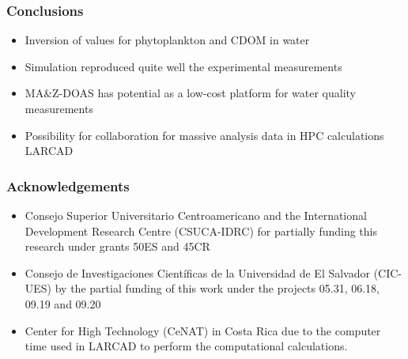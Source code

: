 \documentclass{beamer}
\begin{document}
\begin{frame}
\frametitle{Conclusions}
\begin{itemize}
\item Inversion of values for phytoplankton and CDOM in water
\item Simulation reproduced quite well the experimental measurements
\item MA\&Z-DOAS has potential as a low-cost platform for water quality measurements
\item Possibility for collaboration for massive analysis data in HPC calculations LARCAD
\end{itemize}
\end{frame}

\begin{frame}
\frametitle{Acknowledgements}
\begin{itemize}
\item Consejo Superior Universitario Centroamericano and the International Development Research Centre (CSUCA-IDRC) for partially funding this research under grants 50ES and 45CR
\item Consejo de Investigaciones Científicas de la Universidad de El Salvador (CIC-UES) by the partial funding of this work under the projects 05.31, 06.18, 09.19 and 09.20
\item Center for High Technology (CeNAT) in Costa Rica due to the computer time used in LARCAD to perform the computational calculations.
\end{itemize}
\end{frame}
\end{document}
